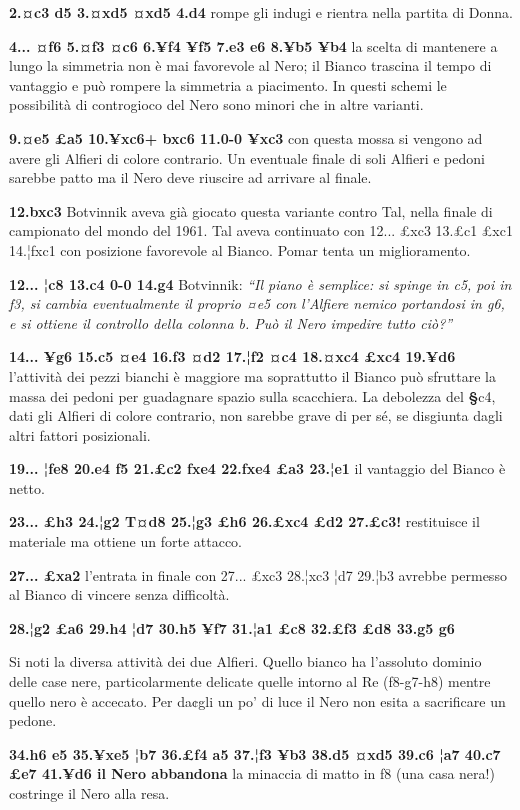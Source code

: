 \textbf{2.¤c3 d5 3.¤xd5 ¤xd5 4.d4} rompe gli indugi e rientra nella
partita di Donna.

\textbf{4... ¤f6 5.¤f3 ¤c6 6.¥f4 ¥f5 7.e3 e6 8.¥b5 ¥b4} la scelta di
mantenere a lungo la simmetria non è mai favorevole al Nero; il Bianco
trascina il tempo di vantaggio e può rompere la simmetria a piacimento.
In questi schemi le possibilità di controgioco del Nero sono minori che
in altre varianti.

\textbf{9.¤e5 £a5 10.¥xc6+ bxc6 11.0-0 ¥xc3} con questa mossa si vengono
ad avere gli Alfieri di colore contrario. Un eventuale finale di soli
Alfieri e pedoni sarebbe patto ma il Nero deve riuscire ad arrivare al
finale.

\textbf{12.bxc3} Botvinnik aveva già giocato questa variante contro Tal,
nella finale di campionato del mondo del 1961. Tal aveva continuato con
12... £xc3 13.£c1 £xc1 14.¦fxc1 con posizione favorevole al Bianco.
Pomar tenta un miglioramento.

\textbf{12... ¦c8 13.c4 0-0 14.g4} Botvinnik: \emph{``Il piano è
semplice: si spinge in c5, poi in f3, si cambia eventualmente il proprio
¤e5 con l'Alfiere nemico portandosi in g6, e si ottiene il controllo
della colonna b. Può il Nero impedire tutto ciò?''}

\textbf{14... ¥g6 15.c5 ¤e4 16.f3 ¤d2 17.¦f2 ¤c4 18.¤xc4 £xc4 19.¥d6}
l'attività dei pezzi bianchi è maggiore ma soprattutto il Bianco può
sfruttare la massa dei pedoni per guadagnare spazio sulla scacchiera. La
debolezza del \textbf{§}c4, dati gli Alfieri di colore contrario, non
sarebbe grave di per sé, se disgiunta dagli altri fattori posizionali.

\textbf{19... ¦fe8 20.e4 f5 21.£c2 fxe4 22.fxe4 £a3 23.¦e1} il vantaggio
del Bianco è netto.

\textbf{23... £h3 24.¦g2 T¤d8 25.¦g3 £h6 26.£xc4 £d2 27.£c3!}
restituisce il materiale ma ottiene un forte attacco.

\textbf{27... £xa2} l'entrata in finale con 27... £xc3 28.¦xc3 ¦d7
29.¦b3 avrebbe permesso al Bianco di vincere senza difficoltà.

\textbf{28.¦g2 £a6 29.h4 ¦d7 30.h5 ¥f7 31.¦a1 £c8 32.£f3 £d8 33.g5 g6}


Si noti la diversa attività dei due Alfieri. Quello bianco ha l'assoluto
dominio delle case nere, particolarmente delicate quelle intorno al Re
(f8-g7-h8) mentre quello nero è accecato. Per da¢gli un po' di luce il
Nero non esita a sacrificare un pedone.

\textbf{34.h6 e5 35.¥xe5 ¦b7 36.£f4 a5 37.¦f3 ¥b3 38.d5 ¤xd5 39.c6 ¦a7
40.c7 £e7 41.¥d6 il Nero abbandona} la minaccia di matto in f8 (una casa
nera!) costringe il Nero alla resa.
